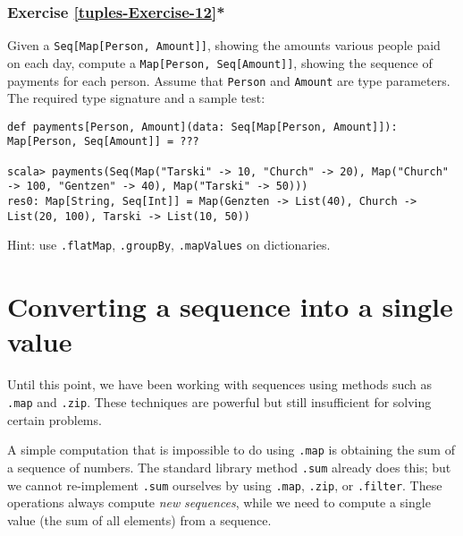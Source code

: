 \subsubsection{Exercise \label{tuples-Exercise-12}\ref{tuples-Exercise-12}{*}}

Given a \lstinline!Seq[Map[Person, Amount]]!, showing the amounts
various people paid on each day, compute a \lstinline!Map[Person, Seq[Amount]]!,
showing the sequence of payments for each person. Assume that \lstinline!Person!
and \lstinline!Amount! are type parameters. The required type signature
and a sample test:
\begin{lstlisting}
def payments[Person, Amount](data: Seq[Map[Person, Amount]]): Map[Person, Seq[Amount]] = ???

scala> payments(Seq(Map("Tarski" -> 10, "Church" -> 20), Map("Church" -> 100, "Gentzen" -> 40), Map("Tarski" -> 50)))
res0: Map[String, Seq[Int]] = Map(Genzten -> List(40), Church -> List(20, 100), Tarski -> List(10, 50))
\end{lstlisting}

Hint: use \lstinline!.flatMap!, \lstinline!.groupBy!, \lstinline!.mapValues!
on dictionaries.%
\begin{comment}
Solution:
\begin{lstlisting}
def payments[Person, Amount](data: Seq[Map[Person, Amount]]): Map[Person, Seq[Amount]] = data.flatMap(_.toSeq).groupBy(_._1).mapValues(_.map(_._2))
\end{lstlisting}
\end{comment}


\section{Converting a sequence into a single value}

Until this point, we have been working with sequences using methods
such as \lstinline!.map! and \lstinline!.zip!. These techniques
are powerful but still insufficient for solving certain problems.

A simple computation that is impossible to do using \lstinline!.map!
is obtaining the sum of a sequence of numbers. The standard library
method \lstinline!.sum! already does this; but we cannot re-implement
\lstinline!.sum! ourselves by using \lstinline!.map!, \lstinline!.zip!,
or \lstinline!.filter!. These operations always compute \emph{new}
\emph{sequences}, while we need to compute a single value (the sum
of all elements) from a sequence. 

